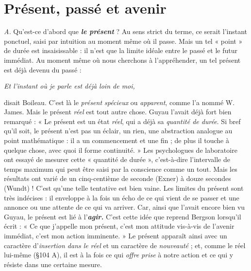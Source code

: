 \section{Présent, passé et avenir}%
{\it A.} Qu'est-ce d’abord que
\textbf{\textit {le présent}} ? Au sens strict du terme, ce serait l'instant ponctuel, saisi
par intuition au moment même où il passe. Mais un tel « point » de
durée est insaisissable : il n’est que la limite idéale entre le passé et
le futur immédiat. Au moment même où nous cherchons à l’appréhender,
un tel présent est déjà devenu du passé :
\begin{center}
{\it Et l'instant où je parle est déjà loin de moi,}
\end{center}
disait Boileau. C’est là le {\it présent spécieux} ou {\it apparent}, comme l’a
nommé W. James. Mais le présent {\it réel} est tout autre chose. Guyau
l'avait déjà fort bien remarqué : « Le présent est un état {\it réel}, qui a
déjà sa {\it quantité de durée}. Si bref qu’il soit, le présent n’est pas un
éclair, un rien, une abstraction analogue au point mathématique : il
a un commencement et une fin ; de plus il touche à quelque chose, avec
quoi il forme continuité. » Les psychologues de laboratoire ont essayé
de mesurer cette « quantité de durée », c’est-à-dire l'intervalle de temps
maximum qui peut être saisi par la conscience comme un tout. Mais
les résultats ont varié de un cinq-centième de seconde (Exner) à
douze secondes (Wundt) ! C’est qu’une telle tentative est bien vaine.
Les limites du présent sont très indécises : il enveloppe à la fois un
écho de ce qui vient de se passer et une annonce ou une attente de ce
qui va arriver. Car, ainsi que l’avait encore bien vu Guyau, le présent
est lié à l’\textbf{\textit {agir.}} C’est cette idée que reprend Bergson lorsqu'il écrit :
« Ce que j'appelle mon présent, c’est mon attitude vis-à-vis de l'avenir
immédiat, c’est mon action imminente. » Le présent apparaît ainsi
avec un caractère d'{\it insertion dans le réel} et un caractère de {\it nouveauté} ;
et, comme le réel lui-même (\S 104 A), il est à la fois ce qui {\it offre prise}
à notre action et ce qui y résiste dans une certaine mesure.

